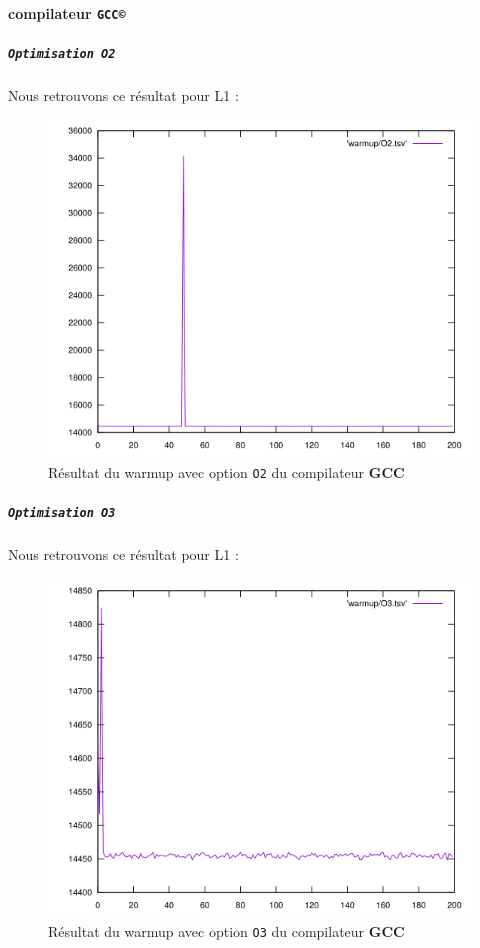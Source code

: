 \documentclass{report}
\begin{document}
      \paragraph{compilateur \texttt{GCC©}}
        \subparagraph{ \texttt{Optimisation O2}}
      Nous retrouvons ce résultat pour L1 :
      \begin{figure}[ht!]
        \centering
        \includegraphics[scale=0.45]{resources/L1/warmup/O2.png}
        \caption{Résultat du warmup avec option \texttt{O2} du compilateur \textbf{GCC}}
      \end{figure}
      \newpage
      \subparagraph{ \texttt{Optimisation O3}}
    Nous retrouvons ce résultat pour L1 :
    \begin{figure}[ht!]
      \centering
      \includegraphics[scale=0.45]{resources/L1/warmup/O3.png}
      \caption{Résultat du warmup avec option \texttt{O3} du compilateur \textbf{GCC}}
    \end{figure}
\end{document}
